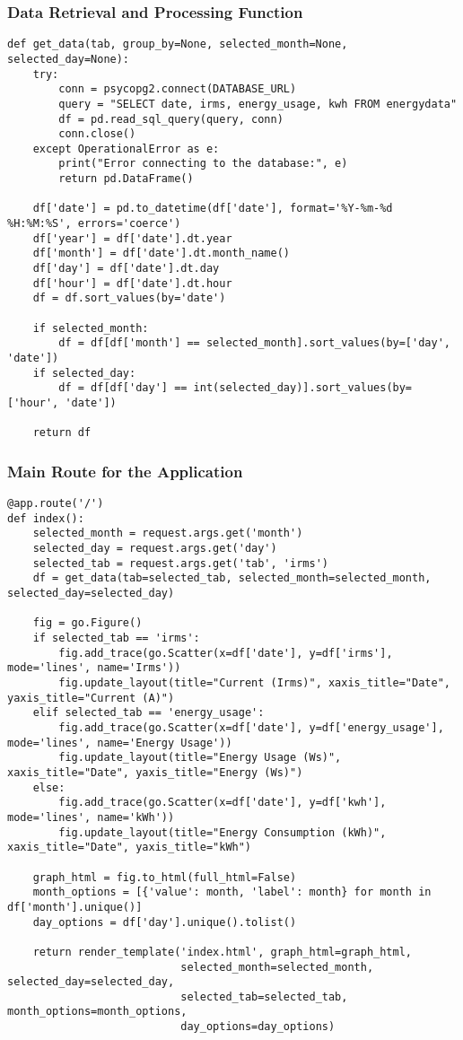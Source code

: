 \subsubsection{Data Retrieval and Processing Function}
\begin{lstlisting}[style=Python, caption=app.py - Data Retrieval, frame=single]
def get_data(tab, group_by=None, selected_month=None, selected_day=None):
    try:
        conn = psycopg2.connect(DATABASE_URL)
        query = "SELECT date, irms, energy_usage, kwh FROM energydata"
        df = pd.read_sql_query(query, conn)
        conn.close()
    except OperationalError as e:
        print("Error connecting to the database:", e)
        return pd.DataFrame()

    df['date'] = pd.to_datetime(df['date'], format='%Y-%m-%d %H:%M:%S', errors='coerce')
    df['year'] = df['date'].dt.year
    df['month'] = df['date'].dt.month_name()
    df['day'] = df['date'].dt.day
    df['hour'] = df['date'].dt.hour
    df = df.sort_values(by='date')

    if selected_month:
        df = df[df['month'] == selected_month].sort_values(by=['day', 'date'])
    if selected_day:
        df = df[df['day'] == int(selected_day)].sort_values(by=['hour', 'date'])

    return df
\end{lstlisting}

\subsubsection{Main Route for the Application}
\begin{lstlisting}[style=Python, caption=app.py - Main Route, frame=single]
@app.route('/')
def index():
    selected_month = request.args.get('month')
    selected_day = request.args.get('day')
    selected_tab = request.args.get('tab', 'irms')
    df = get_data(tab=selected_tab, selected_month=selected_month, selected_day=selected_day)

    fig = go.Figure()
    if selected_tab == 'irms':
        fig.add_trace(go.Scatter(x=df['date'], y=df['irms'], mode='lines', name='Irms'))
        fig.update_layout(title="Current (Irms)", xaxis_title="Date", yaxis_title="Current (A)")
    elif selected_tab == 'energy_usage':
        fig.add_trace(go.Scatter(x=df['date'], y=df['energy_usage'], mode='lines', name='Energy Usage'))
        fig.update_layout(title="Energy Usage (Ws)", xaxis_title="Date", yaxis_title="Energy (Ws)")
    else:
        fig.add_trace(go.Scatter(x=df['date'], y=df['kwh'], mode='lines', name='kWh'))
        fig.update_layout(title="Energy Consumption (kWh)", xaxis_title="Date", yaxis_title="kWh")

    graph_html = fig.to_html(full_html=False)
    month_options = [{'value': month, 'label': month} for month in df['month'].unique()]
    day_options = df['day'].unique().tolist()

    return render_template('index.html', graph_html=graph_html,
                           selected_month=selected_month, selected_day=selected_day,
                           selected_tab=selected_tab, month_options=month_options,
                           day_options=day_options)
\end{lstlisting}

